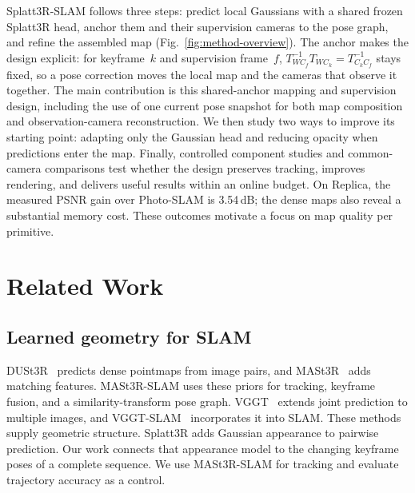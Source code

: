 Splatt3R-SLAM follows three steps: predict local Gaussians with a shared
frozen Splatt3R head, anchor them and their supervision cameras to the pose
graph, and refine the assembled map (Fig.~\ref{fig:method-overview}). The
anchor makes the design explicit: for keyframe~$k$ and supervision frame~$f$,
$T_{WC_f}^{-1}T_{WC_k}=T_{C_kC_f}^{-1}$ stays fixed, so a pose correction moves
the local map and the cameras that observe it together.
The main contribution is this shared-anchor mapping and supervision design,
including the use of one current pose snapshot for both map composition and
observation-camera reconstruction.
We then study two ways to improve its starting point: adapting only the
Gaussian head and reducing opacity when predictions enter the map.
Finally, controlled component studies and common-camera comparisons test
whether the design preserves tracking, improves rendering, and delivers
useful results within an online budget. On Replica, the measured PSNR gain
over Photo-SLAM is 3.54\,dB; the dense maps also reveal a substantial memory
cost. These outcomes motivate a focus on map quality per primitive.

\section{Related Work}
\subsection{Learned geometry for SLAM}
DUSt3R~\cite{wang2024dust3r} predicts dense pointmaps from image pairs, and
MASt3R~\cite{leroy2024mast3r} adds matching features. MASt3R-SLAM uses these
priors for tracking, keyframe fusion, and a similarity-transform pose graph.
VGGT~\cite{wang2025vggt} extends joint prediction to multiple images, and
VGGT-SLAM~\cite{maggio2025vggtslam} incorporates it into SLAM.
These methods supply geometric structure. Splatt3R adds Gaussian appearance
to pairwise prediction. Our work connects that appearance model to the
changing keyframe poses of a complete sequence. We use MASt3R-SLAM for
tracking and evaluate trajectory accuracy as a control.

